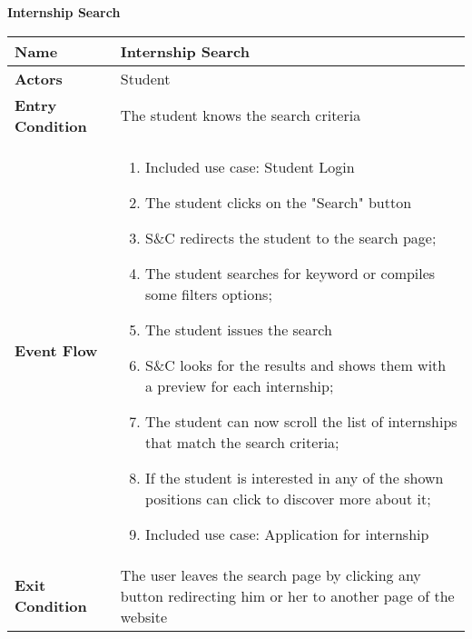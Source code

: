 \begin{enumerate}[label=\textbf{[US\arabic*]}, left = 0pt, align = left]
\begin{longtable}{|l|p{11cm}|}
            \end{longtable}

            \newpage
            \item \textbf{Internship Search}
            
            \begin{longtable}{|l|p{11cm}|}  
                \hline
                \textbf{Name} & 
                    \textbf{Internship Search} \\
                \hline
                
                \textbf{Actors} & 
                    Student \\
                \hline
                
                \textbf{Entry Condition} & 
                The student knows the search criteria \\
                \hline
                
                \textbf{Event Flow} &
                    \begin{enumerate}[label=\arabic*., itemsep=0.2em]
                        \item Included use case: Student Login
                        \item The student clicks on the "Search" button
                        \item S\&C redirects the student to the search page;
                        \item The student searches for keyword or compiles some filters options;
                        \item The student issues the search
                        \item S\&C looks for the results and shows them with a preview for each internship;
                        \item The student can now scroll the list of internships that match the search criteria;
                        \item If the student is interested in any of the shown positions can click to discover more about it;
                        \item Included use case: Application for internship
                    \end{enumerate} \\
                \hline
                
                \textbf{Exit Condition} & 
                    The user leaves the search page by clicking any button redirecting him or her to another page of the website \\
                \hline
                

\end{longtable}
\end{enumerate}
